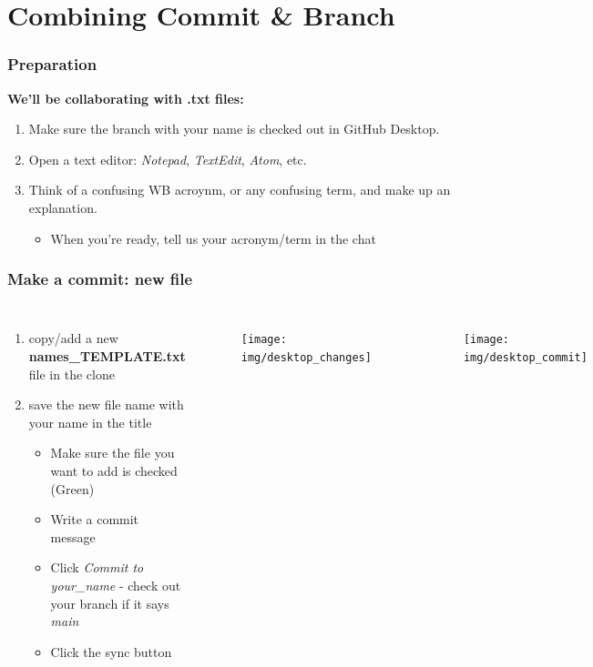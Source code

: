 \documentclass[aspectratio=169]{beamer} %
\begin{document}
\section{Combining Commit \& Branch}

\begin{frame}
\frametitle{Preparation}

\textbf{We'll be collaborating with .txt files:}
\begin{enumerate}
	\item Make sure the branch with your name is checked out in GitHub Desktop.
	\item Open a text editor: \textit{Notepad}, \textit{TextEdit}, \textit{Atom}, etc.
	\item Think of a confusing WB acroynm, or any confusing term, and make up an explanation.
	\begin{itemize}
		\item When you're ready, tell us your acronym/term in the chat
	\end{itemize}
\end{enumerate}

\end{frame}



\begin{frame}
\frametitle{Make a commit: new file}
	\begin{columns}[c]
			\begin{enumerate}
				\item copy/add a new \textbf{names\_TEMPLATE.txt} file in the clone
				\item save the new file name with your name in the title
				\begin{itemize}
					\item Make sure the file you want to add is checked (Green)
					\item Write a commit message
					\item Click \textit{Commit to your\_name} - check out your branch if it says \textit{main}
					\item Click the sync button
				\end{itemize}
			\end{enumerate}

			\begin{figure}
				\centering
				\texttt{[image: img/desktop\_changes]}
				\label{fig:desktopchanges}
			\end{figure}

		\vspace{-1cm}

			\begin{figure}
				\centering
				\texttt{[image: img/desktop\_commit]}
				\label{fig:desktop_commit}
			\end{figure}

	\end{columns}

	\end{frame}
\end{document}
